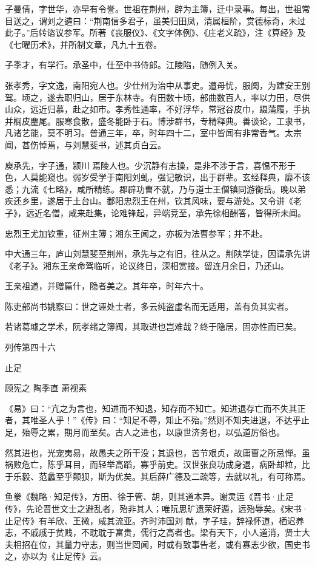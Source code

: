 \documentclass[12pt,UTF8]{ctexbook}
\begin{document}
子曼倩，字世华，亦早有令誉。世祖在荆州，辟为主簿，迁中录事。每出，世祖常目送之，谓刘之遴曰：“荆南信多君子，虽美归田凤，清属桓阶，赏德标奇，未过此子。”后转谘议参军。所著《丧服仪》、《文字体例》、《庄老义疏》，注《算经》及《七曜历术》，并所制文章，凡九十五卷。

子季才，有学行。承圣中，仕至中书侍郎。江陵陷，随例入关。

张孝秀，字文逸，南阳宛人也。少仕州为治中从事史。遭母忧，服阕，为建安王别驾。顷之，遂去职归山，居于东林寺。有田数十顷，部曲数百人，率以力田，尽供山众，远近归慕，赴之如市。孝秀性通率，不好浮华，常冠谷皮巾，蹑蒲履，手执并榈皮麈尾。服寒食散，盛冬能卧于石。博涉群书，专精释典。善谈论，工隶书，凡诸艺能，莫不明习。普通三年，卒，时年四十二，室中皆闻有非常香气。太宗闻，甚伤悼焉，与刘慧斐书，述其贞白云。

庾承先，字子通，颍川焉陵人也。少沉静有志操，是非不涉于言，喜愠不形于色，人莫能窥也。弱岁受学于南阳刘虬，强记敏识，出于群辈。玄经释典，靡不该悉；九流《七略》，咸所精练。郡辟功曹不就，乃与道士王僧镇同游衡岳。晚以弟疾还乡里，遂居于土台山。鄱阳忠烈王在州，钦其风味，要与游处。又令讲《老子》，远近名僧，咸来赴集，论难锋起，异端竞至，承先徐相酬答，皆得所未闻。

忠烈王尤加钦重，征州主簿；湘东王闻之，亦板为法曹参军；并不赴。

中大通三年，庐山刘慧斐至荆州，承先与之有旧，往从之。荆陕学徒，因请承先讲《老子》。湘东王亲命驾临听，论议终日，深相赏接。留连月余日，乃还山。

王亲祖道，并赠篇什，隐者美之。其年卒，时年六十。

陈吏部尚书姚察曰：世之诬处士者，多云纯盗虚名而无适用，盖有负其实者。

若诸葛璩之学术，阮孝绪之簿阀，其取进也岂难哉？终于隐居，固亦性而已矣。





列传第四十六

止足

顾宪之 陶季直 萧视素

《易》曰：“亢之为言也，知进而不知退，知存而不知亡。知进退存亡而不失其正者，其唯圣人乎！”《传》曰：“知足不辱，知止不殆。”然则不知夫进退，不达乎止足，殆辱之累，期月而至矣。古人之进也，以康世济务也，以弘道厉俗也。

然其进也，光宠夷易，故愚夫之所干没；其退也，苦节艰贞，故庸曹之所忌惮。虽祸败危亡，陈乎耳目，而轻举高蹈，寡乎前史。汉世张良功成身退，病卧却粒，比于乐毅、范蠡至乎颠狈，斯为优矣。其后薛广德及二疏等，去就以礼，有可称焉。

鱼豢《魏略·知足传》，方田、徐于管、胡，则其道本异。谢灵运《晋书·止足传》，先论晋世文士之避乱者，殆非其人；唯阮思旷遗荣好遁，远殆辱矣。《宋书·止足传》有羊欣、王微，咸其流亚。齐时沛国刘献，字子珪，辞禄怀道，栖迟养志，不戚戚于贫贱，不耽耽于富贵，儒行之高者也。梁有天下，小人道消，贤士大夫相招在位，其量力守志，则当世罔闻，时或有致事告老，或有寡志少欲，国史书之，亦以为《止足传》云。
\end{document}
